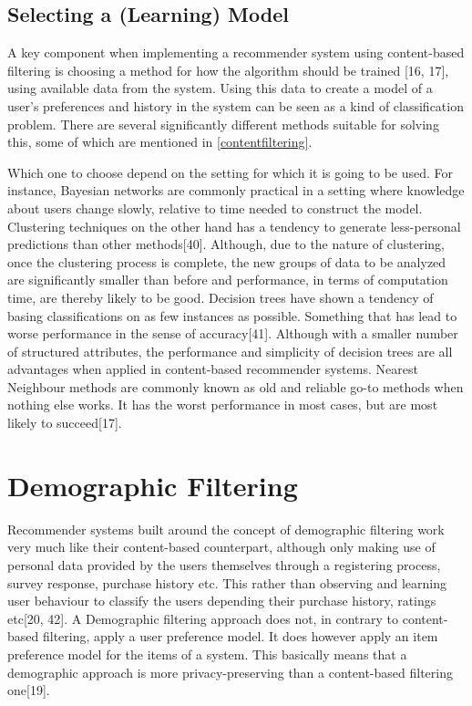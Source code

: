 \subsection{Selecting a (Learning) Model}\label{trainingmodel}
A key component when implementing a recommender system using content-based filtering is choosing a method for how the algorithm should be trained [16, 17], using available data from the system. Using this data to create a model of a user’s preferences and history in the system can be seen as a kind of classification problem. There are several significantly different methods suitable for solving this, some of which are mentioned in \autoref{contentfiltering}.

Which one to choose depend on the setting for which it is going to be used. For instance, Bayesian networks are commonly practical in a setting where knowledge about users change slowly, relative to time needed to construct the model. Clustering techniques on the other hand has a tendency to generate less-personal predictions than other methods[40]. Although, due to the nature of clustering, once the clustering process is complete, the new groups of data to be analyzed are significantly smaller than before and performance, in terms of computation time, are thereby likely to be good. Decision trees have shown a tendency of basing classifications on as few instances as possible. Something that has lead to worse performance in the sense of accuracy[41]. Although with a smaller number of structured attributes, the performance and simplicity of decision trees are all advantages when applied in content-based recommender systems. Nearest Neighbour methods are commonly known as old and reliable go-to methods when nothing else works. It has the worst performance in most cases, but are most likely to succeed[17].

\section{Demographic Filtering}
Recommender systems built around the concept of demographic filtering work very much like their content-based counterpart, although only making use of personal data provided by the users themselves through a registering process, survey response, purchase history etc. This rather than observing and learning user behaviour to classify the users depending their purchase history, ratings etc[20, 42]. A Demographic filtering approach does not, in contrary to content-based filtering, apply a user preference model. It does however apply an item preference model for the items of a system. This basically means that a demographic approach is more privacy-preserving than a content-based filtering one[19].

